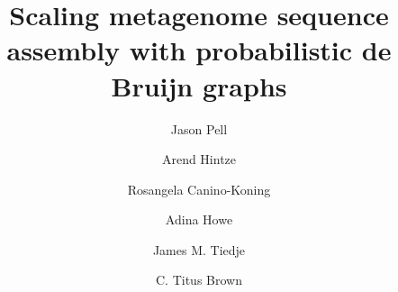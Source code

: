 \documentclass{pnastwo}
\begin{document}
\title{Scaling metagenome sequence assembly with probabilistic de Bruijn
graphs}

\author{
Jason Pell
\and
Arend Hintze
\and
Rosangela Canino-Koning
\and
Adina Howe
\and
James M. Tiedje
\and
C. Titus Brown
}

\maketitle

\end{document}

